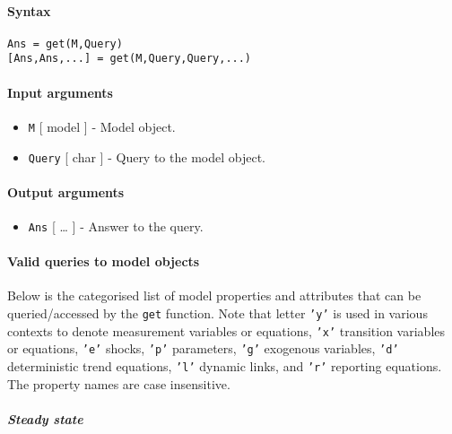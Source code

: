 


	\paragraph{Syntax}\label{syntax}

\begin{verbatim}
Ans = get(M,Query)
[Ans,Ans,...] = get(M,Query,Query,...)
\end{verbatim}

\paragraph{Input arguments}\label{input-arguments}

\begin{itemize}
\item
  \texttt{M} {[} model {]} - Model object.
\item
  \texttt{Query} {[} char {]} - Query to the model object.
\end{itemize}

\paragraph{Output arguments}\label{output-arguments}

\begin{itemize}
\itemsep1pt\parskip0pt
\item
  \texttt{Ans} {[} \ldots{} {]} - Answer to the query.
\end{itemize}

\paragraph{Valid queries to model
objects}\label{valid-queries-to-model-objects}

Below is the categorised list of model properties and attributes that
can be queried/accessed by the \texttt{get} function. Note that letter
\texttt{'y'} is used in various contexts to denote measurement variables
or equations, \texttt{'x'} transition variables or equations,
\texttt{'e'} shocks, \texttt{'p'} parameters, \texttt{'g'} exogenous
variables, \texttt{'d'} deterministic trend equations, \texttt{'l'}
dynamic links, and \texttt{'r'} reporting equations. The property names
are case insensitive.

\subparagraph{Steady state}\label{steady-state}


